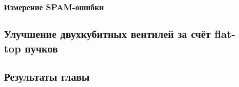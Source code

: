 \subsubsection{Измерение SPAM-ошибки}

\subsection{Улучшение двухкубитных вентилей за счёт flat-top пучков}

\subsection{Результаты главы}


\newpage